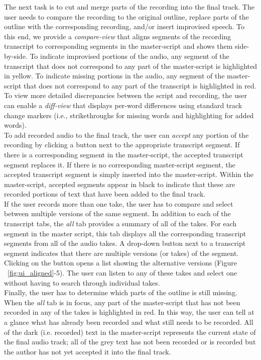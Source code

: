 The next task is to cut and merge parts of the recording into the final track. The user needs to compare the recording to the original outline, replace parts of the outline with the corresponding recording, and/or insert improvised speech. To this end, we provide a \textit{compare-view} that aligns segments of the recording transcript to corresponding segments in the master-script and shows them side-by-side. To indicate improvised portions of the audio, any segment of the transcript that does not correspond to any part of the master-script is highlighted in yellow. To indicate missing portions in the audio, any segment of the master-script that does not correspond to any part of the transcript is highlighted in red. To
view more detailed discrepancies between the script and recording, the
user can enable a \textit{diff-view} that displays per-word differences
using standard track change markers (i.e., strikethroughs for
missing words and highlighting for added words). \\

To add recorded audio to the final track, the user can \textit{accept} any portion of the recording by clicking a button next to the appropriate transcript segment. If there is a corresponding segment in the master-script, the accepted transcript segment replaces it. If there is no corresponding master-script segment, the accepted transcript segment is simply inserted into the master-script. Within the master-script, accepted segments appear in black to indicate that these are recorded portions of text that have been added to the final track. \\

If the user records more than one take, the user has to compare and select between multiple versions of the same segment. In addition to each of the transcript tabs, the \textit{all} tab provides a summary of all of the takes. For each segment in the master script, this tab displays all the corresponding transcript segments from all of the audio takes. A drop-down button next to a transcript segment  indicates that there are multiple versions (or takes)  of the  segment. Clicking on the button opens a list showing the alternative versions (Figure ~\ref{fig:ui_aligned}-5). The user can listen to any of these takes and select one without having to search through individual takes. \\

Finally, the user has to determine which parts of the outline is still missing. When the \textit{all} tab is in focus, any part of the master-script that has not been recorded in any of the takes is highlighted in red. In this way, the user can tell at a glance what has already been recorded and what still needs to be recorded. All of the dark (i.e. recorded) text in the master-script represents the current state of the final audio track; all of the grey text has not been recorded or is recorded but the author has not yet accepted it into the final track. 

